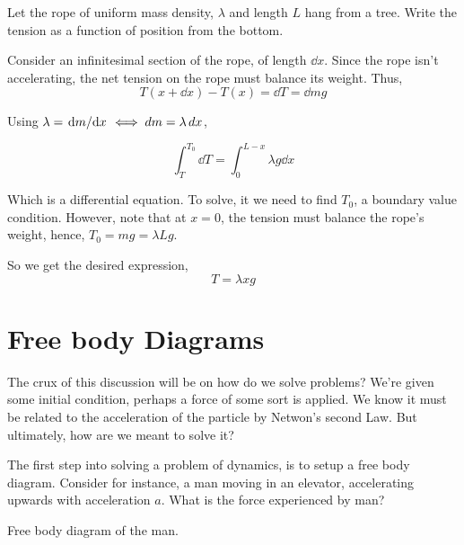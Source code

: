\begin{example}
    Let the rope of uniform mass density, \(\lambda\) and length \(L\) hang from a tree. Write the tension as 
    a function of position from the bottom. 

    \begin{soln}
        Consider an infinitesimal section of the rope, of length \(\dd{x}\). Since 
        the rope isn't accelerating, the net tension on the rope must balance its weight.
        Thus,
        \begin{equation*}
            T(x + \dd{x}) - T(x) = \dd{T} = \dd{m} g
        \end{equation*}

        Using \(\lambda = \dv*{m}{x} \iff \mathop{}\!{d}{m} = \lambda \mathop{}\!{d}{x}\),

        \begin{equation*}
            \int_{T}^{T_0} \dd{T} = \int_0^{L-x} \lambda g \dd{x}
        \end{equation*}

        Which is a differential equation. To solve, it we need to find \(T_0\), 
        a boundary value condition. However, note that at \(x = 0\), 
        the tension must balance the rope's weight, hence, \(T_0 = mg = \lambda Lg\).

        So we get the desired expression, \begin{equation*}
            T = \lambda xg
        \end{equation*}
    \end{soln}
\end{example}

\section{Free body Diagrams}

The crux of this discussion will be on how do we solve problems? We're given 
some initial condition, perhaps a force of some sort is applied. We know it must be 
related to the acceleration of the particle by Netwon's second Law. But ultimately, how are 
we meant to solve it?

The first step into solving a problem of dynamics, is to setup a free body diagram.
Consider for instance, a man moving in an elevator, accelerating upwards with acceleration 
\(a\). What is the force experienced by man?

\begin{marginfigure}
    \caption{Free body diagram of the man.}
\end{marginfigure}

